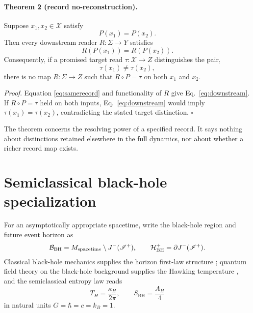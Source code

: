 \documentclass[aps,prd,reprint,nofootinbib,superscriptaddress]{revtex4-2}
\newcommand{\Iplus}{\mathscr I^+}
\newcommand{\BH}{\mathrm{BH}}
\begin{document}
\paragraph{Theorem 2 (record no-reconstruction).}
Suppose $x_1,x_2\in\mathcal X$ satisfy
\begin{equation}
P(x_1)=P(x_2).
\label{eq:samerecord}
\end{equation}
Then every downstream reader $R:\Sigma\to Y$ satisfies
\begin{equation}
\boxed{R(P(x_1))=R(P(x_2)).}
\label{eq:downstream}
\end{equation}
Consequently, if a promised target read $\tau:\mathcal X\to Z$ distinguishes the pair,
\begin{equation}
\tau(x_1)\neq\tau(x_2),
\end{equation}
there is no map $R:\Sigma\to Z$ such that $R\circ P=\tau$ on both $x_1$ and $x_2$.

\emph{Proof.}
Equation \eqref{eq:samerecord} and functionality of $R$ give Eq.~\eqref{eq:downstream}. If $R\circ P=\tau$ held on both inputs, Eq.~\eqref{eq:downstream} would imply $\tau(x_1)=\tau(x_2)$, contradicting the stated target distinction. \hfill$\square$

The theorem concerns the resolving power of a specified record. It says nothing about distinctions retained elsewhere in the full dynamics, nor about whether a richer record map exists.

\section{Semiclassical black-hole specialization}

For an asymptotically appropriate spacetime, write the black-hole region and future event horizon as
\begin{equation}
\mathcal B_{\BH}=M_{\rm spacetime}\setminus J^-(\Iplus),
\qquad
\mathcal H^+_{\BH}=\partial J^-(\Iplus).
\label{eq:horizon}
\end{equation}
Classical black-hole mechanics supplies the horizon first-law structure \cite{BardeenCarterHawking1973}; quantum field theory on the black-hole background supplies the Hawking temperature \cite{Hawking1975}, and the semiclassical entropy law reads \cite{Bekenstein1973,Hawking1975}
\begin{equation}
T_H=\frac{\kappa_H}{2\pi},
\qquad
\boxed{S_{\BH}=\frac{A_H}{4}}
\label{eq:BHlaw}
\end{equation}
in natural units $G=\hbar=c=k_B=1$.
\end{document}
